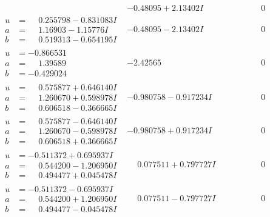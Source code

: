 \documentclass[1p]{elsarticle_modified}
\theoremstyle{definition}
\begin{document}
$$\begin{array}{c|c|c}
 & -0.48095 + 2.13402 I & \phantom{-0.000000 } 0 \\ \hline\begin{aligned}
u &= \phantom{-}0.255798 - 0.831083 I \\
a &= \phantom{-}1.16903 - 1.15776 I \\
b &= \phantom{-}0.519313 - 0.654195 I\end{aligned}
 & -0.48095 - 2.13402 I & \phantom{-0.000000 } 0 \\ \hline\begin{aligned}
u &= -0.866531\phantom{ +0.000000I} \\
a &= \phantom{-}1.39589\phantom{ +0.000000I} \\
b &= -0.429024\phantom{ +0.000000I}\end{aligned}
 & -2.42565\phantom{ +0.000000I} & \phantom{-0.000000 } 0 \\ \hline\begin{aligned}
u &= \phantom{-}0.575877 + 0.646140 I \\
a &= \phantom{-}1.260670 + 0.598978 I \\
b &= \phantom{-}0.606518 - 0.366665 I\end{aligned}
 & -0.980758 - 0.917234 I & \phantom{-0.000000 } 0 \\ \hline\begin{aligned}
u &= \phantom{-}0.575877 - 0.646140 I \\
a &= \phantom{-}1.260670 - 0.598978 I \\
b &= \phantom{-}0.606518 + 0.366665 I\end{aligned}
 & -0.980758 + 0.917234 I & \phantom{-0.000000 } 0 \\ \hline\begin{aligned}
u &= -0.511372 + 0.695937 I \\
a &= \phantom{-}0.544200 - 1.206950 I \\
b &= \phantom{-}0.494477 + 0.045478 I\end{aligned}
 & \phantom{-}0.077511 + 0.797727 I & \phantom{-0.000000 } 0 \\ \hline\begin{aligned}
u &= -0.511372 - 0.695937 I \\
a &= \phantom{-}0.544200 + 1.206950 I \\
b &= \phantom{-}0.494477 - 0.045478 I\end{aligned}
 & \phantom{-}0.077511 - 0.797727 I & \phantom{-0.000000 } 0 \\ \hline\begin{aligned}

\end{aligned}
\end{array}$$
\end{document}
